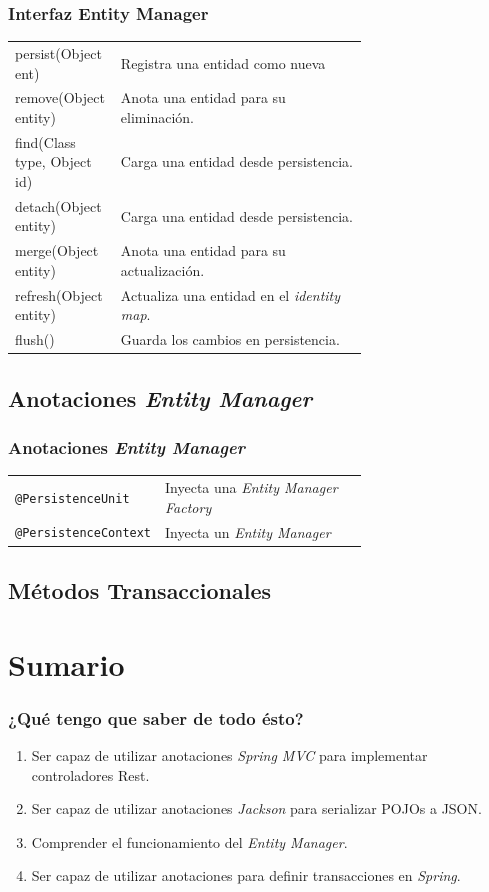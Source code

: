 \documentclass[a4paper,slidestop,xcolor=pst,blue]{beamer}
\newcommand{\ann}[1]{\color{blue}\texttt{#1}\color{black}}
\begin{document}
\begin{frame}[c]
    \frametitle{Interfaz Entity Manager}
    \begin{tabular}{lp{0.70\linewidth}}
        persist(Object ent)    & Registra una entidad como nueva \\
        remove(Object entity)  & Anota una entidad para su eliminación.    \\
        find(Class type, Object id) & Carga una entidad desde persistencia. \\
        detach(Object entity)  & Carga una entidad desde persistencia. \\
        merge(Object entity)   & Anota una entidad para su actualización.  \\
        refresh(Object entity) & Actualiza una entidad en el \emph{identity map}. \\
        flush()                & Guarda los cambios en persistencia. \\
    \end{tabular}
\end{frame}

\subsection{Anotaciones \emph{Entity Manager}}

\begin{frame}[c]
    \frametitle{Anotaciones \emph{Entity Manager}}
    \begin{tabular}{lp{0.70\linewidth}}
        \ann{@PersistenceUnit}    & Inyecta una \emph{Entity Manager Factory} \\
        \ann{@PersistenceContext} & Inyecta un \emph{Entity Manager} \\
    \end{tabular}
\end{frame}

\subsection{Métodos Transaccionales}


\section{Sumario}

\begin{frame}[c]
    \frametitle{¿Qué tengo que saber de todo ésto?}
    \begin{enumerate}[<+->]
        \item Ser capaz de utilizar anotaciones \emph{Spring MVC} para implementar controladores Rest.
        \item Ser capaz de utilizar anotaciones \emph{Jackson} para serializar POJOs a JSON.
        \item Comprender el funcionamiento del \emph{Entity Manager}.
        \item Ser capaz de utilizar anotaciones para definir transacciones en \emph{Spring}.
    \end{enumerate}
\end{frame}
\end{document}
